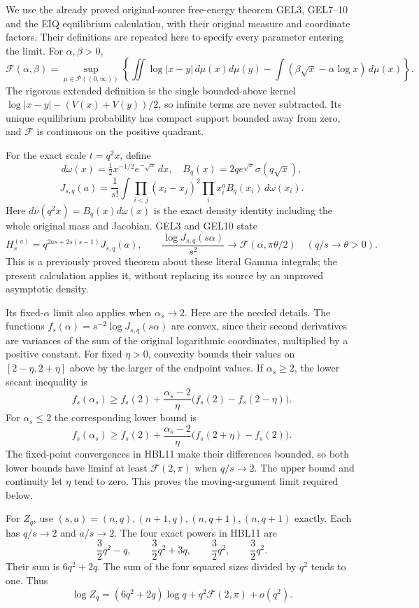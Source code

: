\documentclass[11pt,a4paper]{article}
\begin{document}
We use the already proved original-source free-energy theorem GEL3,
GEL7--10 and the EIQ equilibrium calculation, with their original
measure and coordinate factors. Their definitions are repeated here
to specify every parameter entering the limit. For $\alpha,\beta>0$,
\[
 \mathcal F(\alpha,\beta)=\sup_{\mu\in\mathcal P((0,\infty))}
 \left\{\iint\log|x-y|\,d\mu(x)d\mu(y)
            -\int(\beta\sqrt x-\alpha\log x)\,d\mu(x)\right\}.
 \tag{HBL10}
\]
The rigorous extended definition is the single bounded-above kernel
$\log|x-y|-(V(x)+V(y))/2$, so infinite terms are never subtracted.
Its unique equilibrium probability has compact support bounded away
from zero, and $\mathcal F$ is continuous on the positive quadrant.

For the exact scale $t=q^2x$, define
\[
 d\omega(x)=\tfrac12x^{-1/2}e^{-\sqrt x}\,dx,
 \quad B_q(x)=2qe^{\sqrt x}\sigma(q\sqrt x),
\]
\[
 J_{s,q}(a)=\frac1{s!}\int\prod_{i<j}(x_i-x_j)^2
                    \prod_i x_i^aB_q(x_i)\,d\omega(x_i).
\]
Here $d\nu(q^2x)=B_q(x)d\omega(x)$ is the exact density identity
including the whole original mass and Jacobian. GEL3 and GEL10 state
\[
 H_s^{(a)}=q^{2as+2s(s-1)}J_{s,q}(a),\qquad
 \frac{\log J_{s,q}(s\alpha)}{s^2}
       \longrightarrow\mathcal F(\alpha,\pi\theta/2)
       \quad(q/s\to\theta>0).
 \tag{HBL11}
\]
This is a previously proved theorem about these literal Gamma integrals;
the present calculation applies it, without replacing its source by an
unproved asymptotic density.

Its fixed-$\alpha$ limit also applies when $\alpha_s\to2$. Here are
the needed details. The functions
$f_s(\alpha)=s^{-2}\log J_{s,q}(s\alpha)$ are convex, since their
second derivatives are variances of the sum of the original logarithmic
coordinates, multiplied by a positive constant. For fixed $\eta>0$,
convexity bounds their values on $[2-\eta,2+\eta]$ above by the larger
of the endpoint values. If $\alpha_s\ge2$, the lower secant inequality is
\[
 f_s(\alpha_s)\ge f_s(2)
 +\frac{\alpha_s-2}{\eta}\big(f_s(2)-f_s(2-\eta)\big).
\]
For $\alpha_s\le2$ the corresponding lower bound is
\[
 f_s(\alpha_s)\ge f_s(2)
 +\frac{\alpha_s-2}{\eta}\big(f_s(2+\eta)-f_s(2)\big).
\]
The fixed-point convergences in HBL11 make their differences bounded,
so both lower bounds have liminf at least $\mathcal F(2,\pi)$ when
$q/s\to2$. The upper bound and continuity let $\eta$ tend to zero.
This proves the moving-argument limit required below.

For $Z_q$, use $(s,a)=(n,q),(n+1,q),(n,q+1),(n,q+1)$ exactly.
Each has $q/s\to2$ and $a/s\to2$. The four exact powers in HBL11 are
\[
 \frac32q^2-q,\qquad\frac32q^2+3q,
 \qquad\frac32q^2,\qquad\frac32q^2.
\]
Their sum is $6q^2+2q$. The sum of the four squared sizes divided
by $q^2$ tends to one. Thus
\[
 \boxed{\log Z_q=(6q^2+2q)\log q
                      +q^2\mathcal F(2,\pi)+o(q^2).}
 \tag{HBL12}
\]
\end{document}
